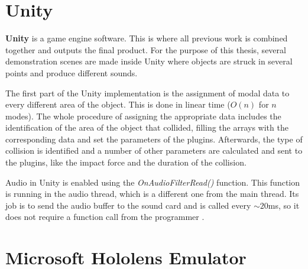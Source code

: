\section{Unity\textsuperscript{\textregistered}}
\textbf{Unity\textsuperscript{\textregistered}} is a game engine software. This is where all previous work is combined together and outputs the final product. For the purpose of this thesis, several demonstration scenes are made inside Unity\textsuperscript{\textregistered} where objects are struck in several points and produce different sounds. 

The first part of the Unity\textsuperscript{\textregistered} implementation is the assignment of modal data to every different area of the object. This is done in linear time ($O(n)$ for $n$ modes). The whole procedure of assigning the appropriate data includes the identification of the area of the object that collided, filling the arrays with the corresponding data and set the parameters of the plugins. Afterwards, the type of collision is identified and a number of other parameters are calculated and sent to the plugins, like the impact force and the duration of the collision.

Audio in Unity\textsuperscript{\textregistered} is enabled using the \textit{OnAudioFilterRead()} function. This function is running in the audio thread, which is a different one from the main thread. Its job is to send the audio buffer to the sound card and is called every $\sim 20$ms, so it does not require a function call from the programmer \cite{bib:unity_doc}.

\section{Microsoft Hololens Emulator}

